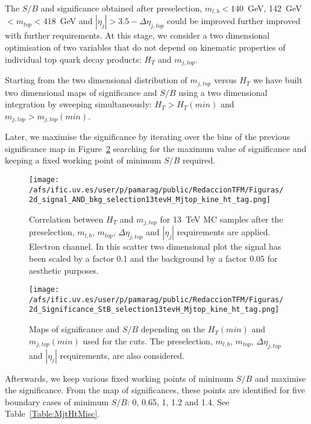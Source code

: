 The $S/B$ and significance obtained after preselection, $m_{l,b}< 140$~GeV, 142~GeV~$ < m_{top} < 418$~GeV and $|\eta_j| > 3.5 - \Delta\eta_{j,top}$ could be improved further improved with further requirements. At this stage, we consider a two dimensional optimisation of two variables that do not depend on kinematic properties of individual top quark decay products: $H_{T}$ and $m_{j,top}$.

Starting from the two dimensional distribution of $m_{j,top}$ versus $H_{T}$ we have built two dimensional maps of significance and $S/B$ using a two dimensional integration by sweeping simultaneously: $H_{T} > H_{T}(min)$ and $m_{j,top}> m_{j,top}(min)$.

Later, we maximise the significance by iterating over the bins of the previous significance map in Figure~\ref{Fig:MjtHt_Sig_SB} searching for the maximum value of significance and keeping a fixed working point of minimum $S/B$ required.

\begin{figure}[htb]
\centering
\texttt{[image: /afs/ific.uv.es/user/p/pamarag/public/RedaccionTFM/Figuras/2d\_signal\_AND\_bkg\_selection13tevH\_Mjtop\_kine\_ht\_tag.png]}
\caption{Correlation between $H_{T}$ and $m_{j,top}$ for 13~TeV MC samples after the preselection, $m_{l,b}$, $m_{top}$, $\Delta\eta_{j, top}$ and $|\eta_j|$ requirements are applied. Electron channel. In this scatter two dimensional plot the signal has been scaled by a factor 0.1 and the background by a factor 0.05 for aesthetic purposes.}
\label{Fig:MjtHt_Dist}
\end{figure}

\begin{figure}[htb]
\centering
\texttt{[image: /afs/ific.uv.es/user/p/pamarag/public/RedaccionTFM/Figuras/2d\_Significance\_StB\_selection13tevH\_Mjtop\_kine\_ht\_tag.png]}
\caption{Maps of significance and $S/B$ depending on the $H_{T}(min)$ and $m_{j,top}(min)$ used for the cuts. The preselection, $m_{l,b}$, $m_{top}$, $\Delta\eta_{j, top}$ and $|\eta_j|$ requirements, are also considered.}
\label{Fig:MjtHt_Sig_SB}
\end{figure}

Afterwards, we keep various fixed working points of minimum $S/B$ and maximise the significance. %
 From the map of significances, these points are identified for five boundary cases of minimum $S/B$: 0, 0.65, 1, 1.2 and 1.4. See Table~\ref{Table:MjtHtMisc}. 

